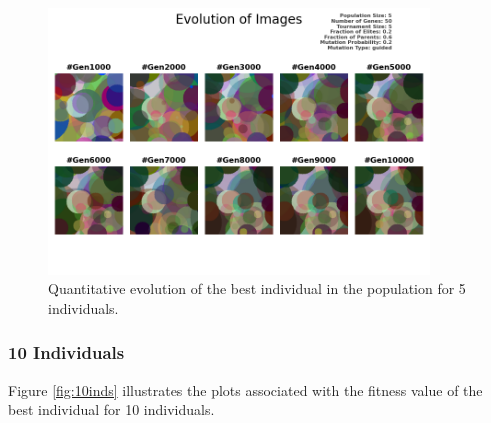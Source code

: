 \documentclass{assignment}
\begin{document}
\begin{figure}[!htb]
    \centering
    \includegraphics[width=0.9\textwidth]{figures/images_output_5_50_5_0.2_0.6_0.2_guided.png}
    \caption{Quantitative evolution of the best individual in the population for 5 individuals.}
    \label{fig:5inds_image}
\end{figure}

\subsubsection{10 Individuals}
Figure \ref{fig:10inds} illustrates the plots associated with the fitness value of the best individual for 10 individuals.
\end{document}
